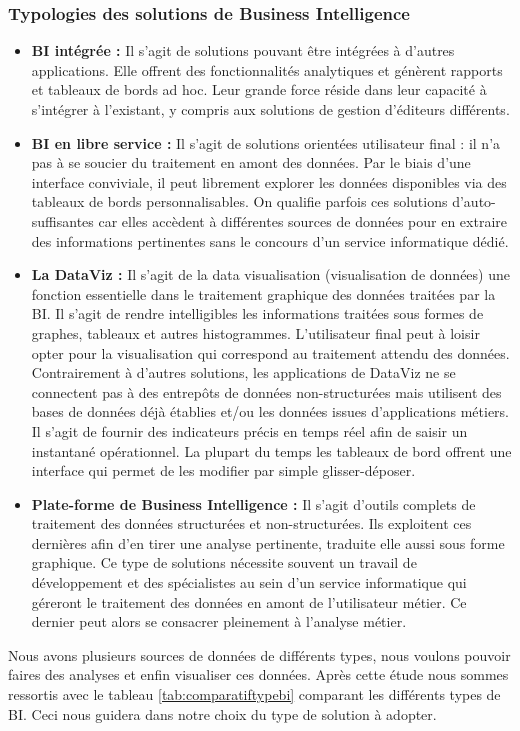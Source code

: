  \subsubsection{Typologies des solutions de Business Intelligence}
 \begin{itemize}
     \item \textbf{BI intégrée :} Il s’agit de solutions pouvant être intégrées à d’autres applications. Elle offrent des fonctionnalités analytiques et génèrent rapports et tableaux de bords ad hoc. Leur grande force réside dans leur capacité à s’intégrer à l’existant, y compris aux solutions de gestion d’éditeurs différents.
     \item \textbf{BI en libre service :} Il s’agit de solutions orientées utilisateur final : il n’a pas à se soucier du traitement en amont des données. Par le biais d’une interface conviviale, il peut librement explorer les données disponibles via des tableaux de bords personnalisables. On qualifie parfois ces solutions d’auto-suffisantes car elles accèdent à différentes sources de données pour en extraire des informations pertinentes sans le concours d’un service informatique dédié.
     \item \textbf{La DataViz :} Il s’agit de la data visualisation (visualisation de données) une fonction essentielle dans le traitement graphique des données traitées par la BI. Il s’agit de rendre intelligibles les informations traitées sous formes de graphes, tableaux et autres histogrammes. L’utilisateur final peut à loisir opter pour la visualisation qui correspond au traitement attendu des données. Contrairement à d’autres solutions, les applications de DataViz ne se connectent pas à des entrepôts de données non-structurées mais utilisent des bases de données déjà établies et/ou les données issues d’applications métiers. Il s’agit de fournir des indicateurs précis en temps réel afin de saisir un instantané opérationnel. La plupart du temps les tableaux de bord offrent une interface qui permet de les modifier par simple glisser-déposer.
     \item \textbf{Plate-forme de Business Intelligence : } Il s’agit d’outils complets de traitement des données structurées et non-structurées. Ils exploitent ces dernières afin d’en tirer une analyse pertinente, traduite elle aussi sous forme graphique. Ce type de solutions nécessite souvent un travail de développement et des spécialistes au sein d’un service informatique qui géreront le traitement des données en amont de l’utilisateur métier. Ce dernier peut alors se consacrer pleinement à l’analyse métier.
 \end{itemize}
 Nous avons plusieurs sources de données de différents types, nous voulons pouvoir faires des analyses et enfin visualiser ces données. Après cette étude nous sommes ressortis avec le tableau \ref{tab:comparatiftypebi} comparant les différents types de BI. Ceci nous guidera dans notre choix du type de solution à adopter.
 
